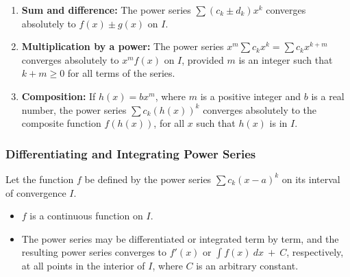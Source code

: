 \begin{enumerate}
    \item \textbf{Sum and difference:} The power series $\sum (c_k \pm d_k)x^k$ converges absolutely to $f(x)\pm g(x)$ on $I$.
    \item \textbf{Multiplication by a power:} The power series $x^m \sum c_k x^k = \sum c_k x^{k + m}$ converges absolutely to $x^m f(x)$ on $I$, provided $m$ is an integer such that $k + m \geq 0$ for all terms of the series.
    \item \textbf{Composition:} If $h(x) = bx^m$, where $m$ is a positive integer and $b$ is a real number, the power series $\sum c_k (h(x))^k$ converges absolutely to the composite function $f(h(x))$, for all $x$ such that $h(x)$ is in $I$.
\end{enumerate}

\subsubsection{Differentiating and Integrating Power Series}
Let the function $f$ be defined by the power series $\sum c_k (x - a)^k$ on its interval of convergence $I$.

\begin{itemize}
    \item $f$ is a continuous function on $I$.
    \item The power series may be differentiated or integrated term by term, and the resulting power series converges to $f'(x)$ or $\int f(x) \ dx \ + \ C$, respectively, at all points in the interior of $I$, where $C$ is an arbitrary constant.
\end{itemize}
